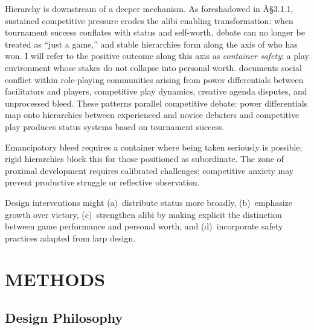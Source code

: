 \documentclass[12pt]{article}
\begin{document}
Hierarchy is downstream of a deeper mechanism. As foreshadowed in Â§3.1.1, sustained competitive pressure erodes the alibi enabling transformation: when tournament success conflates with status and self-worth, debate can no longer be treated as ``just a game,'' and stable hierarchies form along the axis of who has won. I will refer to the positive outcome along this axis as \textit{container safety}: a play environment whose stakes do not collapse into personal worth. \textcite{bowman2013social} documents social conflict within role-playing communities arising from power differentials between facilitators and players, competitive play dynamics, creative agenda disputes, and unprocessed bleed. These patterns parallel competitive debate: power differentials map onto hierarchies between experienced and novice debaters and competitive play produces status systems based on tournament success.

Emancipatory bleed requires a container where being taken seriously is possible; rigid hierarchies block this for those positioned as subordinate. The zone of proximal development requires calibrated challenges; competitive anxiety may prevent productive struggle or reflective observation.

Design interventions might (a)~distribute status more broadly, (b)~emphasize growth over victory, (c)~strengthen alibi by making explicit the distinction between game performance and personal worth, and (d)~incorporate safety practices adapted from larp design.



\section{METHODS}
\label{sec:methods}

\subsection{Design Philosophy}
\end{document}
